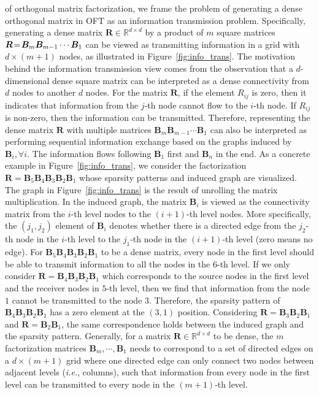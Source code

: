\documentclass{article} %
\newcommand{\ie}{\emph{i.e.}}
\begin{document}
of orthogonal matrix factorization, we frame the problem of generating a dense orthogonal matrix in OFT as an information transmission problem. Specifically, generating a dense matrix $\bm{R}\in\mathbb{R}^{d\times d}$ by a product of $m$ square matrices $\thickmuskip=2mu \medmuskip=2mu \bm{R}=\bm{B}_m\bm{B}_{m-1}\cdots\bm{B}_1$ can be viewed as transmitting information in a grid with $d\times (m+1)$ nodes, as illustrated in Figure~\ref{fig:info_trans}. The motivation
behind the information transmission view comes from the observation that a $d$-dimensional dense square matrix can be interpreted as a dense connectivity from $d$ nodes to another $d$ nodes. For the matrix $\bm{R}$, if the element $R_{ij}$ is zero, then it indicates that information from the $j$-th node cannot flow to the $i$-th node. If $R_{ij}$ is non-zero, then the information can be transmitted. Therefore, representing the dense matrix $\bm{R}$ with multiple matrices $\bm{B}_m\bm{B}_{m-1}\cdots\bm{B}_1$ can also be interpreted as performing sequential information exchange based on the graphs induced by $\bm{B}_i, \forall i$. The information flows following $\bm{B}_1$ first and $\bm{B}_n$ in the end. As a concrete example in Figure~\ref{fig:info_trans}, we consider the factorization $\bm{R}=\bm{B}_5\bm{B}_4\bm{B}_3\bm{B}_2\bm{B}_1$ whose sparsity patterns and induced graph are visualized. The graph in Figure~\ref{fig:info_trans} is the result of unrolling the matrix multiplication. In the induced graph, the matrix $\bm{B}_i$ is viewed as the connectivity matrix from the $i$-th level nodes to the $(i+1)$-th level nodes. More specifically, the $(j_1,j_2)$ element of $\bm{B}_i$ denotes whether there is a directed edge from the $j_2$-th node in the $i$-th level to the $j_1$-th node in the $(i+1)$-th level (zero means no edge). For $\bm{B}_5\bm{B}_4\bm{B}_3\bm{B}_2\bm{B}_1$ to be a dense matrix, every node in the first level should be able to transmit information to all the nodes in the $6$-th level. If we only consider $\bm{R}=\bm{B}_4\bm{B}_3\bm{B}_2\bm{B}_1$ which corresponds to the source nodes in the first level and the receiver nodes in $5$-th level, then we find that information from the node $1$ cannot be transmitted to the node $3$. Therefore, the sparsity pattern of $\bm{B}_4\bm{B}_3\bm{B}_2\bm{B}_1$ has a zero element at the $(3,1)$ position. Considering $\bm{R}=\bm{B}_3\bm{B}_2\bm{B}_1$ and $\bm{R}=\bm{B}_2\bm{B}_1$, the same correspondence holds between the induced graph and the sparsity pattern. Generally, for a matrix $\bm{R}\in\mathbb{R}^{d\times d}$ to be dense, the $m$ factorization matrices $\bm{B}_m,\cdots,\bm{B}_1$ needs to correspond to a set of directed edges on a $d\times (m+1)$ grid where one directed edge can only connect two nodes between adjacent levels (\ie, columns), such that information from every node in the first level can be transmitted to every node in the $(m+1)$-th level.
\end{document}
